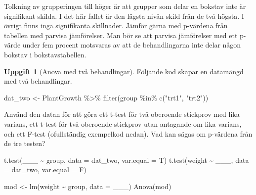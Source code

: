\documentclass[
]{book}
\newenvironment{Shaded}{\begin{snugshade}}{\end{snugshade}}
\newcommand{\AttributeTok}[1]{\textcolor[rgb]{0.77,0.63,0.00}{#1}}
\newcommand{\FunctionTok}[1]{\textcolor[rgb]{0.00,0.00,0.00}{#1}}
\newcommand{\NormalTok}[1]{#1}
\newcommand{\OtherTok}[1]{\textcolor[rgb]{0.56,0.35,0.01}{#1}}
\newcommand{\SpecialCharTok}[1]{\textcolor[rgb]{0.00,0.00,0.00}{#1}}
\newcommand{\StringTok}[1]{\textcolor[rgb]{0.31,0.60,0.02}{#1}}
\theoremstyle{definition}
\theoremstyle{definition}
\theoremstyle{definition}
\newtheorem{exercise}{Uppgift}[chapter]
\theoremstyle{definition}
\theoremstyle{remark}
\begin{document}
Tolkning av grupperingen till höger är att grupper som delar en bokstav inte är signifikant skilda. I det här fallet är den lägsta nivån skild från de två högsta. I övrigt finns inga signifikanta skillnader. Jämför gärna med p-värdena från tabellen med parvisa jämförelser. Man bör se att parvisa jämförelser med ett p-värde under fem procent motsvaras av att de behandlingarna inte delar någon bokstav i bokstavstabellen.

\begin{exercise}[Anova med två behandlingar]

Följande kod skapar en datamängd med två behandlingar.

\begin{Shaded}
\begin{Highlighting}[]
\NormalTok{dat\_two }\OtherTok{\textless{}{-}}\NormalTok{ PlantGrowth }\SpecialCharTok{\%\textgreater{}\%} \FunctionTok{filter}\NormalTok{(group }\SpecialCharTok{\%in\%} \FunctionTok{c}\NormalTok{(}\StringTok{"trt1"}\NormalTok{, }\StringTok{"trt2"}\NormalTok{))}
\end{Highlighting}
\end{Shaded}

Använd den datan för att göra ett t-test för två oberoende stickprov med lika varians, ett t-test för två oberoende stickprov utan antagande om lika varians, och ett F-test (ofullständig exempelkod nedan). Vad kan sägas om p-värdena från de tre testen?

\begin{Shaded}
\begin{Highlighting}[]
\FunctionTok{t.test}\NormalTok{(\_\_\_ }\SpecialCharTok{\textasciitilde{}}\NormalTok{ group, }\AttributeTok{data =}\NormalTok{ dat\_two, }\AttributeTok{var.equal =}\NormalTok{ T)}
\FunctionTok{t.test}\NormalTok{(weight }\SpecialCharTok{\textasciitilde{}}\NormalTok{ \_\_\_, }\AttributeTok{data =}\NormalTok{ dat\_two, }\AttributeTok{var.equal =}\NormalTok{ F)}

\NormalTok{mod }\OtherTok{\textless{}{-}} \FunctionTok{lm}\NormalTok{(weight }\SpecialCharTok{\textasciitilde{}}\NormalTok{ group, }\AttributeTok{data =}\NormalTok{ \_\_\_)}
\FunctionTok{Anova}\NormalTok{(mod)}
\end{Highlighting}
\end{Shaded}

\end{exercise}
\end{document}
